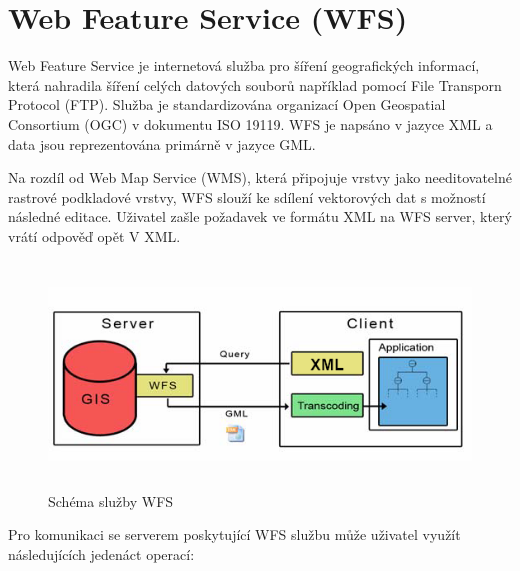 \documentclass[a4paper,oneside,12pt]{book}
\begin{document}
\section{Web Feature Service (WFS)} \label{wfs}
\hspace{10mm} Web Feature Service je internetová služba pro šíření geografických informací, která nahradila šíření celých datových souborů například pomocí File Transporn Protocol (FTP). Služba je standardizována organizací Open Geospatial Consortium (OGC) v dokumentu  ISO 19119. \cite{Vretanos2014} WFS je napsáno v jazyce XML a data jsou reprezentována primárně v jazyce GML. \cite{Zhang2005}

\hspace{10mm} Na rozdíl od Web Map Service (WMS), která připojuje vrstvy jako needitovatelné rastrové podkladové vrstvy, WFS slouží ke sdílení vektorových dat s možností následné editace. Uživatel zašle požadavek ve formátu XML na WFS server, který vrátí odpověď opět V XML. \cite{Zhang2005}

\begin{figure}[ht] \label{obr5}
\centering
\includegraphics[height=6cm]{pictures/XML.png}
\caption{Schéma služby WFS \cite{Schall2009}}
\label{fig:xml}
\end{figure}

\hspace{10mm} Pro komunikaci se serverem poskytující WFS službu může uživatel využít následujících jedenáct operací:
\end{document}
